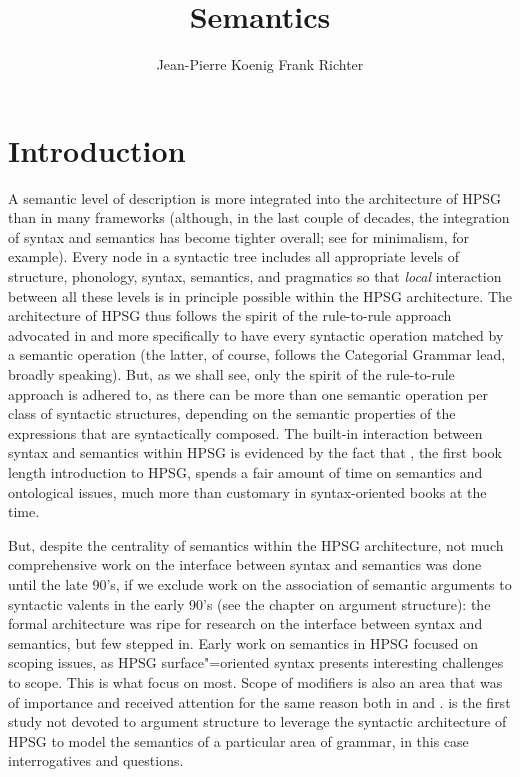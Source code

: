 \documentclass[output=paper]{langsci/langscibook}
\author{%
	Jean-Pierre Koenig\affiliation{University at Buffalo}%
	\lastand Frank Richter\affiliation{Goethe Universität Frankfurt}%
}
\title{Semantics}
\begin{document}
\label{chap-semantics}

\section{Introduction} 

A semantic level of description is more integrated into the architecture of HPSG than in many frameworks  (although, in the last couple of decades, the integration of syntax and semantics has become tighter overall; see \citet{HeimandKratzer1998} for minimalism, for example). Every node in a syntactic tree includes  all appropriate levels of structure, phonology, syntax, semantics, and pragmatics so that \emph{local} interaction between all these levels is in principle possible within the HPSG architecture. The architecture of HPSG thus follows the spirit of the rule-to-rule approach advocated in \citet{Bach1976} and more specifically \citet{KleinandSag1985} to have every syntactic operation matched by a semantic operation (the latter, of course, follows the Categorial Grammar lead, broadly speaking). But, as we shall see, only the spirit of the rule-to-rule approach is adhered to, as there can be more than one semantic operation per class of syntactic structures, depending on the semantic properties of the expressions that are syntactically composed. The built-in interaction between syntax and semantics within HPSG is evidenced by the fact that \citet{PollardandSag1987}, the first book length introduction to HPSG, spends a fair amount of time on semantics and ontological issues, much more than customary in syntax-oriented books at the time.

But, despite the centrality of semantics within the HPSG architecture, not much comprehensive work on the interface between syntax and semantics was done  until the late 90's, if we exclude work on the association of semantic arguments to syntactic valents in the early 90's (see the chapter on argument structure): the formal architecture was ripe for research on the interface between syntax and semantics, but few stepped in. Early work on semantics in HPSG focused on scoping issues, as HPSG surface"=oriented syntax presents interesting challenges to scope. This is what \citet{PollardandSag1987,ps2} focus on most. Scope of modifiers is also an area that was of importance and received attention for the same reason both in \citet{ps2} and \citet{Kasper1997}. \cite{GinzburgandSag2001} is the first study not devoted to argument structure to leverage the syntactic architecture of HPSG to model the semantics of a particular area of grammar, in this case interrogatives and questions. 
\end{document}
